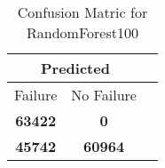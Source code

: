 \begin{table}[] 
\caption{Confusion Matric for RandomForest100} 
\label{Table: Prediction Accuracy-NoneRandomForest100DecisionTrees100EKF-ignoresolarPanelDipole100.9EKF-top2-solarPanelDipole} 
\centering 
\begin{tabular} 
 {@{}ccc@{}} 
\toprule 
\multicolumn{2}{c}{\textbf{Predicted}}
 \\ \midrule 
\multicolumn{1}{|c|}{Failure} & 
\multicolumn{1}{c|}{No Failure}
 \\ \midrule 
\multicolumn{1}{|c|}{\color{green}\textbf{63422}} & 
\multicolumn{1}{c|}{\color{red}\textbf{0}}
 \\ \midrule 
\multicolumn{1}{|c|}{\color{red}\textbf{45742}} & 
\multicolumn{1}{c|}{\color{green}\textbf{60964}}
 \\ \bottomrule 
\end{tabular} 
\end{table} 
